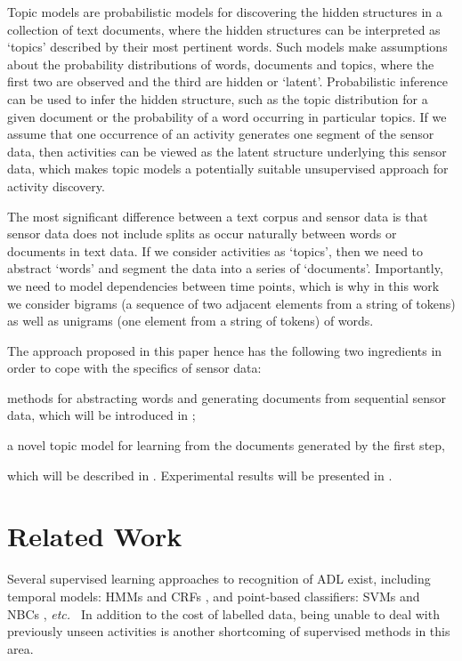 \documentclass{article}
\newcommand{\etc}{{\em etc.~\/}}
\begin{document}
Topic models are probabilistic models for discovering the hidden structures in a collection of text documents, where the hidden structures can be interpreted as `topics' described by their most pertinent words. Such models make assumptions about the probability distributions of words, documents and topics, where the first two are observed and the third are hidden or `latent'. Probabilistic inference can be used to infer the hidden structure, such as the topic distribution for a given document or the probability of a word occurring in particular topics. If we assume that one occurrence of an activity generates one segment of the sensor data, then activities can be viewed as the latent structure underlying this sensor data, which makes topic models a potentially suitable unsupervised approach for activity discovery. 

The most significant difference between a text corpus and sensor data is that sensor data does not include splits as occur naturally between words or documents in text data. If we consider activities as `topics', then we need to abstract `words' and segment the data into a series of `documents'.
Importantly, we need to model dependencies between time points, which is why in this work we consider bigrams (a sequence of two adjacent elements from a string of tokens) as well as unigrams (one element from a string of tokens) of words. 

The approach proposed in this paper hence has the following two ingredients in order to cope with the specifics of sensor data:
\begin{enumerate*}[label=(\roman*)]
\item methods for abstracting words and generating documents from sequential sensor data, which will be introduced in ; \label{step1}
\item a novel topic model for learning from the documents generated by the first step,
\end{enumerate*}
which will be described in . Experimental results will be presented in .

%
\section{Related Work}
Several supervised learning approaches to recognition of \ac{ADL} exist, including 
temporal models: \acp{HMM} \cite{van2008accurate} and \acp{CRF} \cite{wu2007joint}, 
and point-based classifiers: \acp{SVM} \cite{fleury2010svm} and \acp{NBC} \cite{cook2010learning}, \etc 
In addition to the cost of labelled data, being unable to deal with previously unseen activities is another shortcoming of supervised methods in this area.
\end{document}
